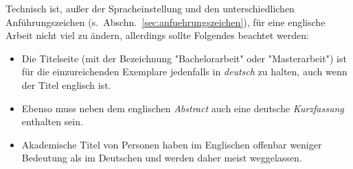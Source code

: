 Technisch ist, außer der Spracheinstellung und den unterschiedlichen
Anführungszeichen (s.\ Abschn.~\ref{sec:anfuehrungszeichen}), für eine
englische Arbeit nicht viel zu ändern, allerdings sollte Folgendes beachtet
werden:
%
\begin{itemize}
    \item Die Titelseite (mit der Bezeichnung "Bachelorarbeit" oder
    "Masterarbeit") ist für die einzureichenden Exemplare jedenfalls in
    \emph{deutsch} zu halten, auch wenn der Titel englisch ist.
    \item Ebenso muss neben dem englischen \emph{Abstract} auch eine deutsche
    \emph{Kurzfassung} enthalten sein. %
    \item Akademische Titel von Personen haben im Englischen offenbar
    weniger Bedeutung als im Deutschen und werden daher meist weggelassen.
\end{itemize}
